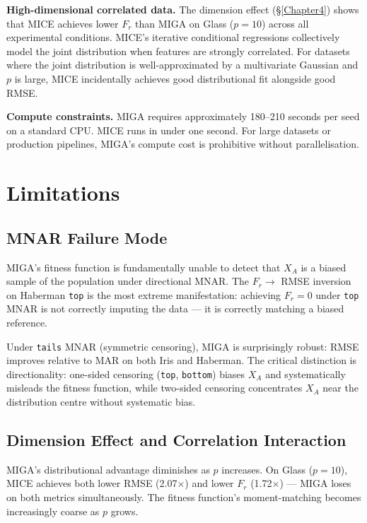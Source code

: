 \textbf{High-dimensional correlated data.} The dimension effect (\S\ref{Chapter4}) shows that MICE achieves lower $F_r$ than MIGA on Glass ($p = 10$) across all experimental conditions. MICE's iterative conditional regressions collectively model the joint distribution when features are strongly correlated. For datasets where the joint distribution is well-approximated by a multivariate Gaussian and $p$ is large, MICE incidentally achieves good distributional fit alongside good RMSE.

\textbf{Compute constraints.} MIGA requires approximately 180--210 seconds per seed on a standard CPU. MICE runs in under one second. For large datasets or production pipelines, MIGA's compute cost is prohibitive without parallelisation.


\section{Limitations}

\subsection{MNAR Failure Mode}

MIGA's fitness function is fundamentally unable to detect that $X_A$ is a biased sample of the population under directional MNAR. The $F_r \rightarrow$ RMSE inversion on Haberman \texttt{top} is the most extreme manifestation: achieving $F_r = 0$ under \texttt{top} MNAR is not correctly imputing the data --- it is correctly matching a biased reference.

Under \texttt{tails} MNAR (symmetric censoring), MIGA is surprisingly robust: RMSE improves relative to MAR on both Iris and Haberman. The critical distinction is directionality: one-sided censoring (\texttt{top}, \texttt{bottom}) biases $X_A$ and systematically misleads the fitness function, while two-sided censoring concentrates $X_A$ near the distribution centre without systematic bias.

\subsection{Dimension Effect and Correlation Interaction}

MIGA's distributional advantage diminishes as $p$ increases. On Glass ($p = 10$), MICE achieves both lower RMSE (2.07$\times$) and lower $F_r$ (1.72$\times$) --- MIGA loses on both metrics simultaneously. The fitness function's moment-matching becomes increasingly coarse as $p$ grows.

